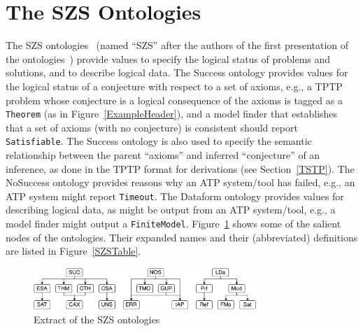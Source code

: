 \documentclass[runningheads]{llncs}
\begin{document}
\section{The SZS Ontologies}
\label{SZS}

The SZS ontologies~\cite{Sut08-KEAPPA} (named ``SZS'' after the authors of the first presentation 
of the ontologies~\cite{SZS03}) provide values to specify the logical status of problems and
solutions, and to describe logical data.
The Success ontology provides values for the logical status of a conjecture with respect to a 
set of axioms, e.g., a TPTP problem whose conjecture is a logical consequence of the axioms 
is tagged as a {\tt Theorem} (as in Figure~\ref{ExampleHeader}), and a model finder that 
establishes that a set of axioms (with no conjecture) is consistent should report 
{\tt Satisfiable}.
The Success ontology is also used to specify the semantic relationship between the parent 
``axioms'' and inferred ``conjecture'' of an inference, as done in the TPTP format for 
derivations (see Section~\ref{TSTP}).
The NoSuccess ontology provides reasons why an ATP system/tool has failed, e.g., an ATP system 
might report {\tt Timeout}.
The Dataform ontology provides values for describing logical data, as might be output 
from an ATP system/tool, e.g., a model finder might output a {\tt FiniteModel}.
Figure~\ref{SZSExtract} shows some of the salient nodes of the ontologies.
Their expanded names and their (abbreviated) definitions are listed in Figure~\ref{SZSTable}.

\begin{figure}[htb]
\centering
\includegraphics[width=0.75\textwidth]{SZSExtract.pdf}
\caption{Extract of the SZS ontologies}
\label{SZSExtract}
\end{figure} 
\end{document}
